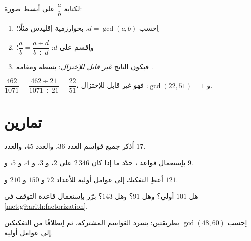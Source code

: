 \begin{method}\label{met:g9:arith:simplify}
لكتابة $\dfrac ab$ على أبسط صورة:
\begin{enumerate}
  \item اِحسب $d = \gcd(a, b)$، بخوارزمية إقليدس مثلًا؛
  \item واِقسم   على $d$:
        $\dfrac ab = \dfrac{a \div d}{b \div d}$؛
  \item فيكون  الناتج \emph{غير قابل للاِختزال}: بسطه
        ومقامه .
\end{enumerate}
\end{method}

\begin{example}
$\dfrac{462}{1071} = \dfrac{462 \div 21}{1071 \div 21} = \dfrac{22}{51}$،
و $\gcd(22, 51) = 1$: فهو غير قابل للاِختزال.
\end{example}

\section{تمارين}

\begin{exercise}[$\star$]\label{exo:g9:arith:1}
اُذكر جميع قواسم العدد $36$، والعدد $45$، والعدد $17$.
\end{exercise}

\begin{exercise}[$\star$]\label{exo:g9:arith:2}
باِستعمال قواعد ، حدّد ما إذا كان $2\,346$
 على $2$، و $3$، و $4$، و $5$، و $9$.
\end{exercise}

\begin{exercise}[$\star$]\label{exo:g9:arith:3}
أعطِ التفكيك إلى عوامل أولية للأعداد $72$ و $150$ و $210$ و $121$.
\end{exercise}

\begin{exercise}[$\star$]\label{exo:g9:arith:4}
هل $101$ أولي؟ وهل $91$؟ وهل $143$؟ برّر باِستعمال قاعدة التوقف
في \cref{met:g9:arith:factorization}.
\end{exercise}

\begin{exercise}[$\star$]\label{exo:g9:arith:5}
اِحسب $\gcd(48, 60)$ بطريقتين: بسرد القواسم المشتركة، ثم
اِنطلاقًا من التفكيكين إلى عوامل أولية.
\end{exercise}

